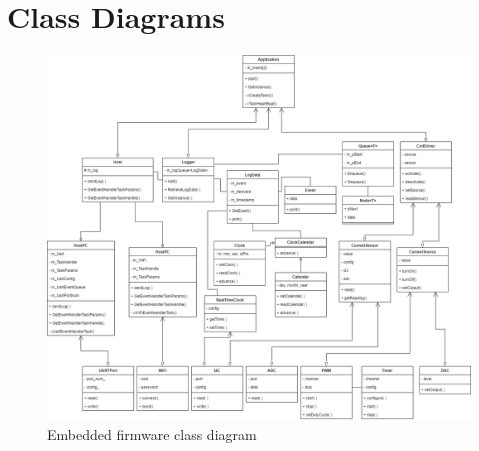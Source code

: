 \documentclass[10pt,twocolumn,letterpaper]{article}
\begin{document}

\onecolumn

\appendix
\appendixpage

\section{Class Diagrams} \label{app:class-diagrams}

\begin{figure}[htb]
  \centering
  \includegraphics[width=\linewidth, keepaspectratio]{figures/emb-class-diagram.png}
  \caption{Embedded firmware class diagram}
  \label{fig:emb-class-diagram}
\end{figure}
\end{document}
